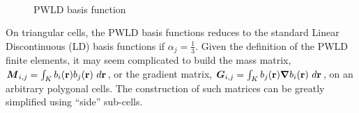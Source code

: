 \begin{figure}[H]
\centering
{}
\\
\caption{PWLD basis function}
\label{pwld}
\end{figure}
On triangular cells, the PWLD basis functions reduces to the standard Linear
Discontinuous (LD) basis functions if $\alpha_j = \frac{1}{3}$. Given the 
definition of the PWLD finite elements, it may seem complicated to build the 
mass matrix, $\bs{M}_{i,j} = \int_{K} b_i(\br) b_j(\br)\ d\br$, or the gradient
matrix, $\bs{G}_{i,j} = \int_K b_j(\br) \bn b_{i}(\br)\ d\br$, on an arbitrary 
polygonal cells. The construction of such matrices can be greatly simplified 
using ``side'' sub-cells. 
